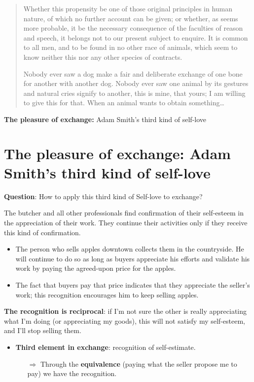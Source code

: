             \begin{quote}
                Whether this propensity be one of those original principles in human nature, of which no further account can be given; or whether, as seems more probable, it be the necessary consequence of the faculties of reason and speech, it belongs not to our present subject to enquire. It is common to all men, and to be found in no other race of animals, which seem to know neither this nor any other species of contracts.
                
                Nobody ever saw a dog make a fair and deliberate exchange of one bone for another with another dog. Nobody ever saw one animal by its gestures and natural cries signify to another, this is mine, that yours; I am willing to give this for that. When an animal wants to obtain something…
            \end{quote}

            \begin{proposition}
                \textbf{The pleasure of exchange:} Adam Smith’s third kind of self-love
            \end{proposition}

\section[The Pleasure of Exchange]{The pleasure of exchange: Adam Smith’s third kind of self-love}

    \textbf{Question}: How to apply this third kind of Self-love to exchange?

    The butcher and all other professionals find confirmation of their self-esteem in the appreciation of their work. They continue their activities only if they receive this kind of confirmation.
        
    \begin{itemize}
        \item The person who sells apples downtown collects them in the countryside. He will continue to do so as long as buyers appreciate his efforts and validate his work by paying the agreed-upon price for the apples.
        \item The fact that buyers pay that price indicates that they appreciate the seller’s work; this recognition encourages him to keep selling apples.
    \end{itemize} 
        
    \textbf{The recognition is reciprocal}: if I’m not sure the other is really appreciating what I’m doing (or appreciating my goods), this will not satisfy my self-esteem, and I’ll stop selling them.
    \begin{itemize}
        \item \textbf{Third element in exchange}: recognition of self-estimate.
            \begin{itemize}
                \item[\(\Rightarrow\)] Through the \textbf{equivalence} (paying what the seller propose me to pay) we have the recognition. 
            \end{itemize}
        \end{itemize}

